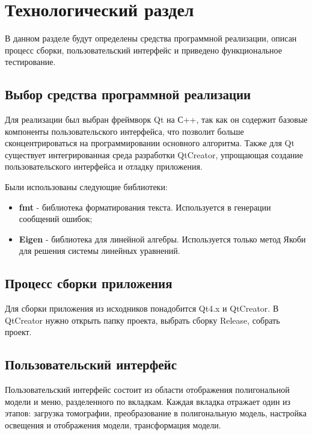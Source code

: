 \chapter{Технологический раздел}

В данном разделе будут определены средства программной реализации, описан процесс сборки, пользовательский интерфейс и приведено функциональное тестирование.

\section{Выбор средства программной реализации}

Для реализации был выбран фреймворк Qt\cite{qt} на С++, так как он содержит базовые компоненты пользовательского интерфейса, что позволит больше сконцентрироваться на программировании основного алгоритма. Также для Qt существует интегрированная среда разработки QtCreator\cite{qtcreator}, упрощающая создание пользовательского интерфейса и отладку приложения.

Были использованы следующие библиотеки:
\begin{itemize}
    \item \textbf{fmt}\cite{libfmt} - библиотека форматирования текста. Используется в генерации сообщений ошибок;
    \item \textbf{Eigen}\cite{libeigen} - библиотека для линейной алгебры. Используется только метод Якоби для решения системы линейных уравнений.
\end{itemize}

\section{Процесс сборки приложения}

Для сборки приложения из исходников понадобится Qt4.x\cite{qt4x} и QtCreator. В QtCreator нужно открыть папку проекта, выбрать сборку Release, собрать проект.

\section{Пользовательский интерфейс}

Пользовательский интерфейс состоит из области отображения полигональной модели и меню, разделенного по вкладкам. Каждая вкладка отражает один из этапов: загрузка томографии, преобразование в полигональную модель, настройка освещения и отображения модели, трансформация модели.

